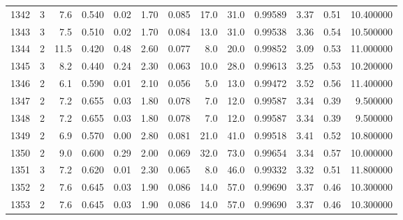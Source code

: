 \begin{tabular}{lrrrrrrrrrrrr}
1342 &        3 &            7.6 &             0.540 &         0.02 &            1.70 &      0.085 &                 17.0 &                  31.0 &  0.99589 &  3.37 &       0.51 &  10.400000 \\
1343 &        3 &            7.5 &             0.510 &         0.02 &            1.70 &      0.084 &                 13.0 &                  31.0 &  0.99538 &  3.36 &       0.54 &  10.500000 \\
1344 &        2 &           11.5 &             0.420 &         0.48 &            2.60 &      0.077 &                  8.0 &                  20.0 &  0.99852 &  3.09 &       0.53 &  11.000000 \\
1345 &        3 &            8.2 &             0.440 &         0.24 &            2.30 &      0.063 &                 10.0 &                  28.0 &  0.99613 &  3.25 &       0.53 &  10.200000 \\
1346 &        2 &            6.1 &             0.590 &         0.01 &            2.10 &      0.056 &                  5.0 &                  13.0 &  0.99472 &  3.52 &       0.56 &  11.400000 \\
1347 &        2 &            7.2 &             0.655 &         0.03 &            1.80 &      0.078 &                  7.0 &                  12.0 &  0.99587 &  3.34 &       0.39 &   9.500000 \\
1348 &        2 &            7.2 &             0.655 &         0.03 &            1.80 &      0.078 &                  7.0 &                  12.0 &  0.99587 &  3.34 &       0.39 &   9.500000 \\
1349 &        2 &            6.9 &             0.570 &         0.00 &            2.80 &      0.081 &                 21.0 &                  41.0 &  0.99518 &  3.41 &       0.52 &  10.800000 \\
1350 &        2 &            9.0 &             0.600 &         0.29 &            2.00 &      0.069 &                 32.0 &                  73.0 &  0.99654 &  3.34 &       0.57 &  10.000000 \\
1351 &        3 &            7.2 &             0.620 &         0.01 &            2.30 &      0.065 &                  8.0 &                  46.0 &  0.99332 &  3.32 &       0.51 &  11.800000 \\
1352 &        2 &            7.6 &             0.645 &         0.03 &            1.90 &      0.086 &                 14.0 &                  57.0 &  0.99690 &  3.37 &       0.46 &  10.300000 \\
1353 &        2 &            7.6 &             0.645 &         0.03 &            1.90 &      0.086 &                 14.0 &                  57.0 &  0.99690 &  3.37 &       0.46 &  10.300000 \\

\end{tabular}
